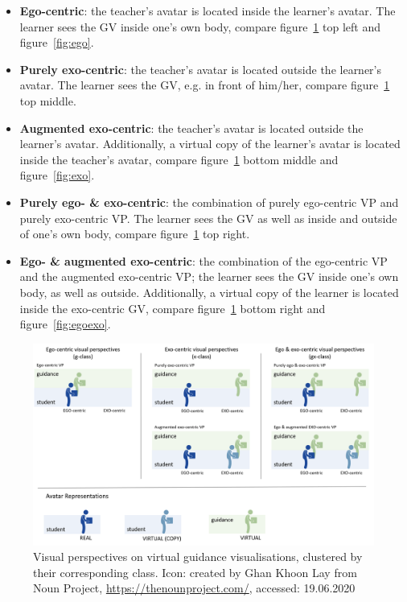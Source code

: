 \begin{itemize}
	\item \textbf{Ego-centric}: the teacher's avatar is located inside the learner's avatar. The learner sees the GV inside one's own body, compare figure~\ref{fig:perspectives} top left and figure~\ref{fig:ego}.
	\item \textbf{Purely exo-centric}: the teacher's avatar is located outside the learner's avatar. The learner sees the GV, e.g. in front of him/her, compare figure~\ref{fig:perspectives} top middle.
	\item \textbf{Augmented exo-centric}: the teacher's avatar is located outside the learner's avatar. Additionally, a virtual copy of the learner's avatar is located inside the teacher's avatar, compare figure~\ref{fig:perspectives} bottom middle and figure~\ref{fig:exo}.
	\item \textbf{Purely ego- \& exo-centric}: the combination of purely ego-centric VP and purely exo-centric VP. The learner sees the GV as well as inside and outside of one's own body, compare figure~\ref{fig:perspectives} top right.
	\item \textbf{Ego- \& augmented exo-centric}: the combination of the ego-centric VP and the augmented exo-centric VP; the learner sees the GV inside one's own body, as well as outside. Additionally, a virtual copy of the learner is located inside the exo-centric GV, compare figure~\ref{fig:perspectives} bottom right and figure~\ref{fig:egoexo}.	
\end{itemize}

\begin{figure}[htb]
	\centering
	\includegraphics[width=\textwidth]{figures/perspectives_new.png}
	\caption[Visual perspectives on vitual guidance visualisations]{Visual perspectives on  virtual guidance visualisations, clustered by their corresponding class. Icon: created by Ghan Khoon Lay from Noun Project, \href{https://thenounproject.com/}{https://thenounproject.com/}, accessed: 19.06.2020}
	\label{fig:perspectives}
\end{figure}

